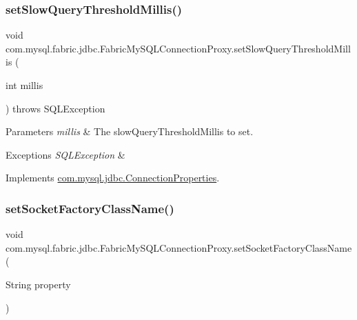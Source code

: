 \subsubsection{\texorpdfstring{set\+Slow\+Query\+Threshold\+Millis()}{setSlowQueryThresholdMillis()}}
{\footnotesize\ttfamily void com.\+mysql.\+fabric.\+jdbc.\+Fabric\+My\+S\+Q\+L\+Connection\+Proxy.\+set\+Slow\+Query\+Threshold\+Millis (\begin{DoxyParamCaption}\item[{int}]{millis }\end{DoxyParamCaption}) throws S\+Q\+L\+Exception}


\begin{DoxyParams}{Parameters}
{\em millis} & The slow\+Query\+Threshold\+Millis to set. \\
\hline
\end{DoxyParams}

\begin{DoxyExceptions}{Exceptions}
{\em S\+Q\+L\+Exception} & \\
\hline
\end{DoxyExceptions}


Implements \mbox{\hyperlink{interfacecom_1_1mysql_1_1jdbc_1_1_connection_properties_a3cfee5c659ab60c5fdb925490d81ad0f}{com.\+mysql.\+jdbc.\+Connection\+Properties}}.

\mbox{\label{classcom_1_1mysql_1_1fabric_1_1jdbc_1_1_fabric_my_s_q_l_connection_proxy_ab4b921704edd8b9a8fcc0a762eb14f80}} 
\subsubsection{\texorpdfstring{set\+Socket\+Factory\+Class\+Name()}{setSocketFactoryClassName()}}
{\footnotesize\ttfamily void com.\+mysql.\+fabric.\+jdbc.\+Fabric\+My\+S\+Q\+L\+Connection\+Proxy.\+set\+Socket\+Factory\+Class\+Name (\begin{DoxyParamCaption}\item[{String}]{property }\end{DoxyParamCaption})}


